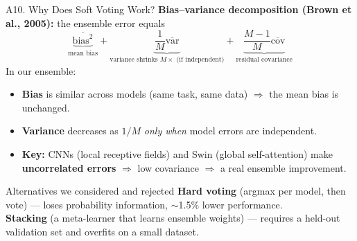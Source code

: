 \documentclass[10pt, aspectratio=169]{beamer}
\begin{document}
\begin{frame}{A10. Why Does Soft Voting Work?}
    \footnotesize
    \textbf{Bias--variance decomposition (Brown et al., 2005):} the ensemble error equals
    \[
        \underbrace{\overline{\mathrm{bias}^2}}_{\text{mean bias}} + \underbrace{\frac{1}{M}\overline{\mathrm{var}}}_{\text{variance shrinks } M\times \text{ (if independent)}} + \underbrace{\frac{M-1}{M}\overline{\mathrm{cov}}}_{\text{residual covariance}}
    \]
    In our ensemble:
    \begin{itemize}
        \item \textbf{Bias} is similar across models (same task, same data) $\Rightarrow$ the mean bias is unchanged.
        \item \textbf{Variance} decreases as $1/M$ \textit{only when} model errors are independent.
        \item \textbf{Key:} CNNs (local receptive fields) and Swin (global self-attention) make \textbf{uncorrelated errors} $\Rightarrow$ low covariance $\Rightarrow$ a real ensemble improvement.
    \end{itemize}

    \vspace{0.15cm}
    \begin{block}{Alternatives we considered and rejected}
        \footnotesize
        \textbf{Hard voting} (argmax per model, then vote) --- loses probability information, $\sim$1.5\% lower performance.\\
        \textbf{Stacking} (a meta-learner that learns ensemble weights) --- requires a held-out validation set and overfits on a small dataset.
    \end{block}
\end{frame}
\end{document}
